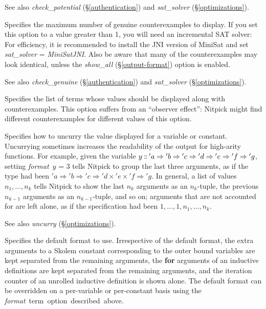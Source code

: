 \documentclass[a4paper,12pt]{article}
\def\Colon{\mathord{:\mkern-1.5mu:}}
\begin{document}
\begin{enum}
\nopagebreak
{\small See also \textit{check\_potential} (\S\ref{authentication}) and
\textit{sat\_solver} (\S\ref{optimizations}).}

Specifies the maximum number of genuine counterexamples to display. If you set
this option to a value greater than 1, you will need an incremental SAT solver:
For efficiency, it is recommended to install the JNI version of MiniSat and set
\textit{sat\_solver} = \textit{MiniSatJNI}. Also be aware that many of the
counterexamples may look identical, unless the \textit{show\_all}
(\S\ref{output-format}) option is enabled.

\nopagebreak
{\small See also \textit{check\_genuine} (\S\ref{authentication}) and
\textit{sat\_solver} (\S\ref{optimizations}).}

Specifies the list of terms whose values should be displayed along with
counterexamples. This option suffers from an ``observer effect'': Nitpick might
find different counterexamples for different values of this option.

Specifies how to uncurry the value displayed for a variable or constant.
Uncurrying sometimes increases the readability of the output for high-arity
functions. For example, given the variable $y \mathbin{\Colon} {'a}\Rightarrow
{'b}\Rightarrow {'c}\Rightarrow {'d}\Rightarrow {'e}\Rightarrow {'f}\Rightarrow
{'g}$, setting \textit{format}~$y$ = 3 tells Nitpick to group the last three
arguments, as if the type had been ${'a}\Rightarrow {'b}\Rightarrow
{'c}\Rightarrow {'d}\times {'e}\times {'f}\Rightarrow {'g}$. In general, a list
of values $n_1,\ldots,n_k$ tells Nitpick to show the last $n_k$ arguments as an
$n_k$-tuple, the previous $n_{k-1}$ arguments as an $n_{k-1}$-tuple, and so on;
arguments that are not accounted for are left alone, as if the specification had
been $1,\ldots,1,n_1,\ldots,n_k$.

\nopagebreak
{\small See also \textit{uncurry} (\S\ref{optimizations}).}

Specifies the default format to use. Irrespective of the default format, the
extra arguments to a Skolem constant corresponding to the outer bound variables
are kept separated from the remaining arguments, the \textbf{for} arguments of
an inductive definitions are kept separated from the remaining arguments, and
the iteration counter of an unrolled inductive definition is shown alone. The
default format can be overridden on a per-variable or per-constant basis using
the \textit{format}~\qty{term} option described above.
\end{enum}
\end{document}
